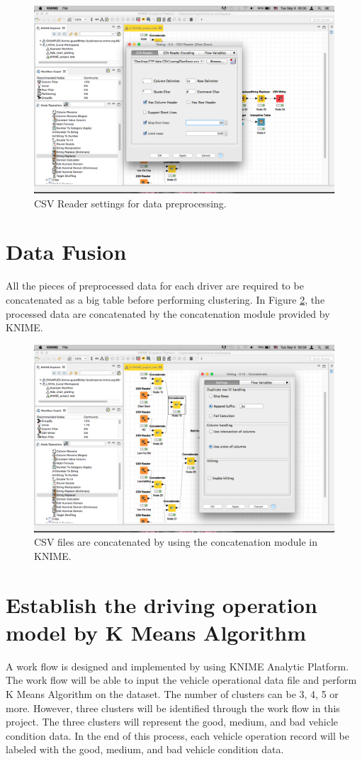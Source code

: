 \begin{figure}[hbt!]\centering
\includegraphics[width=.75\textwidth]{image/datapreprocessing}
\caption{CSV Reader settings for data preprocessing.}
\label{fig:preprocess}
\end{figure}

\section{Data Fusion}
All the pieces of preprocessed data for each driver are required to be concatenated as a big table before performing clustering. In Figure \ref{fig:KNIMEfile}, the processed data are concatenated by the concatenation module provided by KNIME.

\begin{figure}[hbt!]\centering
\includegraphics[width=.75\textwidth]{image/KNIMEconcatenate}
\caption{CSV files are concatenated by using the concatenation module in KNIME.}
\label{fig:KNIMEfile}
\end{figure}

\section{Establish the driving operation model by K Means Algorithm}
A work flow is designed and implemented by using KNIME Analytic Platform. The work flow will be able to input the vehicle operational data file and perform K Means Algorithm on the dataset. The number of clusters can be 3, 4, 5 or more. However, three clusters will be identified through the work flow in this project. The three clusters will represent the good, medium, and bad vehicle condition data. In the end of this process, each vehicle operation record will be labeled with the good, medium, and bad vehicle condition data.

